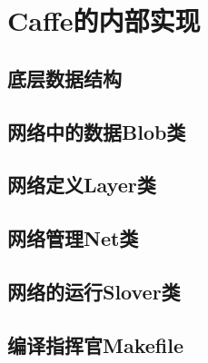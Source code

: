 \documentclass{../NanCNBook}
\begin{document}
\part{Caffe的内部实现}
\chapter{底层数据结构}

\chapter{网络中的数据Blob类}

\chapter{网络定义Layer类}

\chapter{网络管理Net类}

\chapter{网络的运行Slover类}



\begin{cnappendix}
\chapter{编译指挥官Makefile}

\end{cnappendix}
\end{document}
